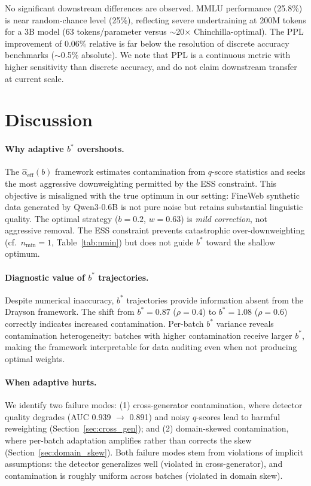\documentclass[11pt]{article}
\begin{document}
No significant downstream differences are observed.
MMLU performance (25.8\%) is near random-chance level (25\%), reflecting severe undertraining at 200M tokens for a 3B model (63 tokens/parameter versus $\sim$20$\times$ Chinchilla-optimal).
The PPL improvement of 0.06\% relative is far below the resolution of discrete accuracy benchmarks ($\sim$0.5\% absolute).
We note that PPL is a continuous metric with higher sensitivity than discrete accuracy, and do not claim downstream transfer at current scale.

\section{Discussion}
\label{sec:discussion}

\paragraph{Why adaptive $b^*$ overshoots.}
The $\hat{\alpha}_{\mathrm{eff}}(b)$ framework estimates contamination from $q$-score statistics and seeks the most aggressive downweighting permitted by the ESS constraint.
This objective is misaligned with the true optimum in our setting: FineWeb synthetic data generated by Qwen3-0.6B is not pure noise but retains substantial linguistic quality.
The optimal strategy ($b = 0.2$, $w = 0.63$) is \emph{mild correction}, not aggressive removal.
The ESS constraint prevents catastrophic over-downweighting (cf.\ $n_{\min} = 1$, Table~\ref{tab:nmin}) but does not guide $b^*$ toward the shallow optimum.

\paragraph{Diagnostic value of $b^*$ trajectories.}
Despite numerical inaccuracy, $b^*$ trajectories provide information absent from the Drayson framework.
The shift from $b^* = 0.87$ ($\rho = 0.4$) to $b^* = 1.08$ ($\rho = 0.6$) correctly indicates increased contamination.
Per-batch $b^*$ variance reveals contamination heterogeneity: batches with higher contamination receive larger $b^*$, making the framework interpretable for data auditing even when not producing optimal weights.

\paragraph{When adaptive hurts.}
We identify two failure modes: (1) cross-generator contamination, where detector quality degrades (AUC 0.939 $\to$ 0.891) and noisy $q$-scores lead to harmful reweighting (Section~\ref{sec:cross_gen}); and (2) domain-skewed contamination, where per-batch adaptation amplifies rather than corrects the skew (Section~\ref{sec:domain_skew}).
Both failure modes stem from violations of implicit assumptions: the detector generalizes well (violated in cross-generator), and contamination is roughly uniform across batches (violated in domain skew).
\end{document}
